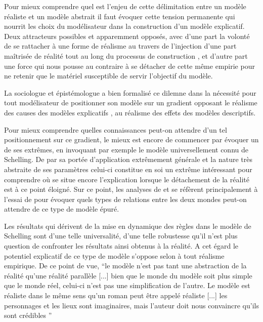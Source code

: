 
Pour mieux comprendre quel est l'enjeu de cette délimitation entre un modèle réaliste et un modèle abstrait il faut évoquer cette tension permanente qui nourrit les choix du modélisateur dans la construction d'un modèle explicatif. Deux attracteurs possibles et apparemment opposés, avec d'une part la volonté de se rattacher à une forme de réalisme au travers de l'injection d'une part maîtrisée de réalité tout au long du processus de construction , et d'autre part une force qui nous pousse au contraire à se détacher de cette même empirie pour ne retenir que le matériel susceptible de servir l'objectif du modèle.

La sociologue et épistémologue \textcite{Bulle2005} a bien formalisé ce dilemne dans la nécessité pour tout modélisateur de positionner son modèle sur un gradient opposant le réalisme des causes des modèles explicatifs , au réalisme des effets des modèles descriptifs.

Pour mieux comprendre quelles connaissances peut-on attendre d'un tel positionnement sur ce gradient, le mieux est encore de commencer par évoquer un de ses extrêmes, en invoquant par exemple le modèle universellement connu de Schelling. De par sa portée d'application extrêmement générale et la nature très abstraite de ses paramètres celui-ci constitue en soi un extrême intéressant pour comprendre où se situe encore l'explication lorsque le détachement de la réalité est à ce point éloigné. Sur ce point, les analyses de \textcite{Bulle2005} et \textcite{Phan2008, Phan2010} se réfèrent principalement à l'essai de \textcite{Sugden2002} pour évoquer quels types de relations entre les deux mondes peut-on attendre de ce type de modèle épuré.

Les résultats qui dérivent de la mise en dynamique des règles dans le modèle de Schelling sont d'une telle universalité, d'une telle robustesse qu'il n'est plus question de confronter les résultats ainsi obtenus à la réalité. A cet égard le potentiel explicatif de ce type de modèle s'oppose selon \textcite{Bulle2005} à tout réalisme empirique. De ce point de vue, \enquote{le modèle n'est pas tant une abstraction de la réalité qu’une réalité parallèle [...] bien que le monde du modèle soit plus simple que le monde réel, celui-ci n'est pas une simplification de l'autre. Le modèle est réaliste dans le même sens qu'un roman peut être appelé réaliste [...] les personnages et les lieux sont imaginaires, mais l'auteur doit nous convaincre qu'ils sont crédibles } \autocites[131]{Sugden2002}[10]{Phan2008}

